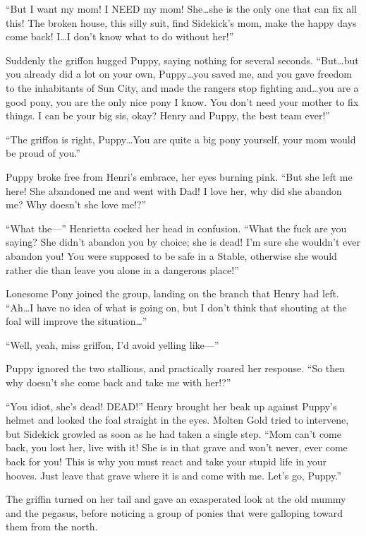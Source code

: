 ``But I want my mom! I NEED my mom! She\dots she is the only one that can fix all this! The broken house, this silly suit, find Sidekick's mom, make the happy days come back! I\dots I don't know what to do without her!''

Suddenly the griffon hugged Puppy, saying nothing for several seconds. ``But\dots but you already did a lot on your own, Puppy\dots you saved me, and you gave freedom to the inhabitants of Sun City, and made the rangers stop fighting and\dots you are a good pony, you are the only nice pony I know. You don't need your mother to fix things. I can be your big sis, okay? Henry and Puppy, the best team ever!''

``The griffon is right, Puppy\dots You are quite a big pony yourself, your mom would be proud of you.''

Puppy broke free from Henri's embrace, her eyes burning pink. ``But she left me here! She abandoned me and went with Dad! I love her, why did she abandon me? Why doesn't she love me!?''

``What the---'' Henrietta cocked her head in confusion. ``What the fuck are you saying? She didn't abandon you by choice; she is dead! I'm sure she wouldn't ever abandon you! You were supposed to be safe in a Stable, otherwise she would rather die than leave you alone in a dangerous place!''

Lonesome Pony joined the group, landing on the branch that Henry had left. ``Ah\dots I have no idea of what is going on, but I don't think that shouting at the foal will improve the situation\dots''

``Well, yeah, miss griffon, I'd avoid yelling like---''

Puppy ignored the two stallions, and practically roared her response. ``So then why doesn't she come back and take me with her!?''

``You idiot, she's dead! DEAD!'' Henry brought her beak up against Puppy's helmet and looked the foal straight in the eyes. Molten Gold tried to intervene, but Sidekick growled as soon as he had taken a single step. ``Mom can't come back, you lost her, live with it! She is in that grave and won't never, ever come back for you! This is why you must react and take your stupid life in your hooves. Just leave that grave where it is and come with me. Let's go, Puppy.''

The griffin turned on her tail and gave an exasperated look at the old mummy and the pegasus, before noticing a group of ponies that were galloping toward them from the north.

